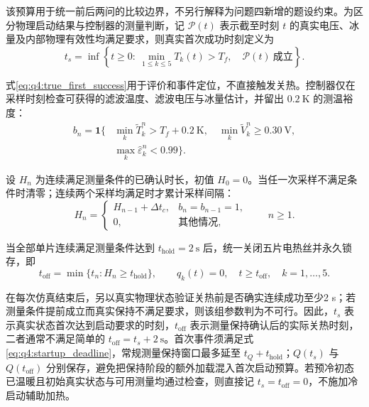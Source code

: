 \documentclass[bwprint]{gmcmthesis}
\numberwithin{figure}{section}
\begin{document}
该预算用于统一前后两问的比较边界，不另行解释为问题四新增的题设约束。为区分物理启动结果与控制器的测量判断，记 $\mathcal P(t)$ 表示截至时刻 $t$ 的真实电压、冰量及内部物理有效性均满足要求，则真实首次成功时刻定义为
\begin{equation}
t_s=\inf\left\{t\geq0:\ \min_{1\leq k\leq5}T_k(t)>T_f,
\quad\mathcal P(t)\ \text{成立}\right\}.
\tag{7-31}\label{eq:q4:true_first_success}
\end{equation}

式\eqref{eq:q4:true_first_success}用于评价和事件定位，不直接触发关热。控制器仅在采样时刻检查可获得的滤波温度、滤波电压与冰量估计，并留出 $0.2\ \mathrm K$ 的测温裕度：
\begin{equation}
\begin{aligned}
b_n=\boldsymbol 1\big\{&
\min_k\widetilde T_k^n>T_f+0.2\ \mathrm K,
\quad\min_k\widetilde V_k^n\geq0.30\ \mathrm V,
\\
&\max_k\widehat\varepsilon_k^n<0.99\big\}.
\end{aligned}
\tag{7-32}\label{eq:q4:sensor_condition}
\end{equation}

设 $H_n$ 为连续满足测量条件的已确认时长，初值 $H_0=0$。当任一次采样不满足条件时清零；连续两个采样均满足时才累计采样间隔：
\begin{equation}
H_n=\begin{cases}
H_{n-1}+\Delta t_c, & b_n=b_{n-1}=1,\\
0, & \text{其他情况},
\end{cases}
\qquad n\geq1.
\tag{7-33}\label{eq:q4:hold_counter}
\end{equation}

当全部单片连续满足测量条件达到 $t_{\mathrm{hold}}=2\ \mathrm s$ 后，统一关闭五片电热丝并永久锁存，即
\begin{equation}
t_{\mathrm{off}}=\min\{t_n:H_n\geq t_{\mathrm{hold}}\},
\qquad q_k(t)=0,\quad t\geq t_{\mathrm{off}},\quad k=1,\ldots,5.
\tag{7-34}\label{eq:q4:shutdown_latch}
\end{equation}

在每次仿真结束后，另以真实物理状态验证关热前是否确实连续成功至少2 s；若测量条件提前成立而真实保持不满足要求，则该组参数判为不可行。因此，$t_s$ 表示真实状态首次达到启动要求的时刻，$t_{\mathrm{off}}$ 表示测量保持确认后的实际关热时刻，二者通常不满足简单的 $t_{\mathrm{off}}=t_s+2\ \mathrm s$。首次事件须满足式\eqref{eq:q4:startup_deadline}，常规测量保持窗口最多延至 $t_Q+t_{\mathrm{hold}}$；$Q(t_s)$ 与 $Q(t_{\mathrm{off}})$ 分别保存，避免把保持阶段的额外加载混入首次启动预算。若预冷初态已温暖且初始真实状态与可用测量均通过检查，则直接记 $t_s=t_{\mathrm{off}}=0$，不施加冷启动辅助加热。
\end{document}

